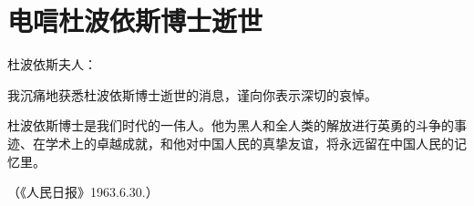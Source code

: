 \section[电唁杜波依斯博士逝世（一九六三年八月二十九日）]{电唁杜波依斯博士逝世}


杜波依斯夫人：

我沉痛地获悉杜波依斯博士逝世的消息，谨向你表示深切的哀悼。

杜波依斯博士是我们时代的一伟人。他为黑人和全人类的解放进行英勇的斗争的事迹、在学术上的卓越成就，和他对中国人民的真挚友谊，将永远留在中国人民的记忆里。

{\raggedleft（《人民日报》1963.6.30.）\par}

